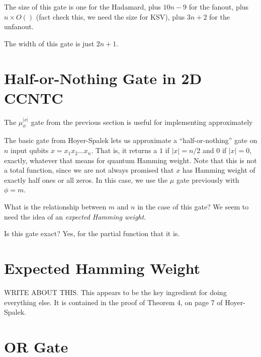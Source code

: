 \documentclass{article}
\begin{document}
The size of this gate is one for the Hadamard, plus $10n-9$ for the
fanout, plus $n \times O()$ (fact check this, we need the size for KSV),
plus $3n+2$ for the unfanout.

The width of this gate is just $2n +1$.

\section{Half-or-Nothing Gate in 2D CCNTC}

The $\mu^{|x|}_\phi$ gate from the previous section is useful for
implementing approximately 

The basic gate from Hoyer-Spalek lets us approximate a ``half-or-nothing'' 
gate on $n$ input qubits $x = x_1 x_2  \ldots x_n$. That is, it returns a
$1$ if $|x| = n/2$ and $0$ if $|x| = 0$, exactly, whatever that means
for quantum Hamming weight. Note that this is not a
total function, since we are not always promised that $x$ has Hamming weight
of exactly half ones or all zeros. In this case, we use the $\mu$ gate
previously with $\phi = m$.

What is the relationship between $m$ and $n$ in the case of this gate?
We seem to need the idea of an \emph{expected Hamming weight}.

Is this gate exact? Yes, for the partial function that it is.

\section{Expected Hamming Weight}

WRITE ABOUT THIS. This appears to be the key ingredient for doing everything
else. It is contained in the proof of Theorem 4, on page 7 of Hoyer-Spalek.

\section{OR Gate}
\end{document}
